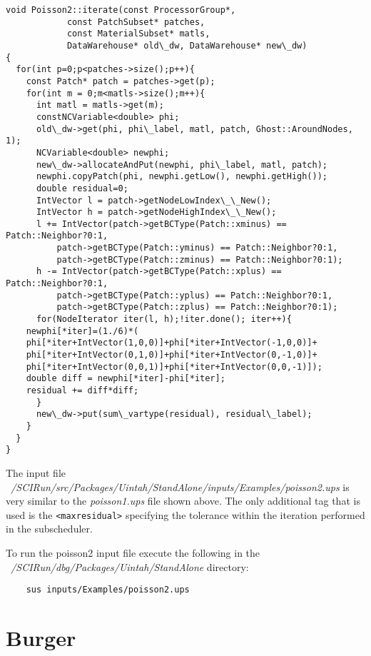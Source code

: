 \documentclass[12pt]{report}
\begin{document}
\begin{verbatim}
void Poisson2::iterate(const ProcessorGroup*,
		    const PatchSubset* patches,
		    const MaterialSubset* matls,
		    DataWarehouse* old\_dw, DataWarehouse* new\_dw)
{
  for(int p=0;p<patches->size();p++){
    const Patch* patch = patches->get(p);
    for(int m = 0;m<matls->size();m++){
      int matl = matls->get(m);
      constNCVariable<double> phi;
      old\_dw->get(phi, phi\_label, matl, patch, Ghost::AroundNodes, 1);
      NCVariable<double> newphi;
      new\_dw->allocateAndPut(newphi, phi\_label, matl, patch);
      newphi.copyPatch(phi, newphi.getLow(), newphi.getHigh());
      double residual=0;
      IntVector l = patch->getNodeLowIndex\_\_New();
      IntVector h = patch->getNodeHighIndex\_\_New(); 
      l += IntVector(patch->getBCType(Patch::xminus) == Patch::Neighbor?0:1,
		  patch->getBCType(Patch::yminus) == Patch::Neighbor?0:1,
		  patch->getBCType(Patch::zminus) == Patch::Neighbor?0:1);
      h -= IntVector(patch->getBCType(Patch::xplus) == Patch::Neighbor?0:1,
		  patch->getBCType(Patch::yplus) == Patch::Neighbor?0:1,
		  patch->getBCType(Patch::zplus) == Patch::Neighbor?0:1);
      for(NodeIterator iter(l, h);!iter.done(); iter++){
	newphi[*iter]=(1./6)*(
	phi[*iter+IntVector(1,0,0)]+phi[*iter+IntVector(-1,0,0)]+
	phi[*iter+IntVector(0,1,0)]+phi[*iter+IntVector(0,-1,0)]+
	phi[*iter+IntVector(0,0,1)]+phi[*iter+IntVector(0,0,-1)]);
	double diff = newphi[*iter]-phi[*iter];
	residual += diff*diff;
      }
      new\_dw->put(sum\_vartype(residual), residual\_label);
    }
  }
}

\end{verbatim}

The input file
\emph{~/SCIRun/src/Packages/Uintah/StandAlone/inputs/Examples/poisson2.ups}
is very similar to the \emph{poisson1.ups} file shown above.  The only
additional tag that is used is the \texttt{<maxresidual>} specifying
the tolerance within the iteration performed in the subscheduler.

To run the poisson2 input file execute the following in the
\emph{~/SCIRun/dbg/Packages/Uintah/StandAlone} directory:

\begin{verbatim}
	sus inputs/Examples/poisson2.ups

\end{verbatim}


\section{Burger}
\end{document}
